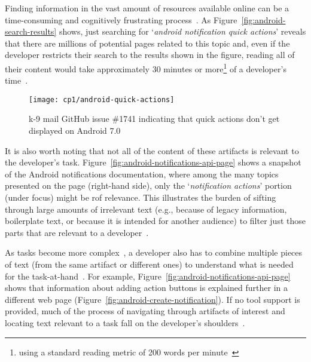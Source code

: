 



Finding information in the vast amount of resources available online can be a time-consuming
and cognitively frustrating process~\cite{Begel2008,
robillard2011field}. 
As Figure~\ref{fig:android-search-results} shows, just searching for `\textit{android notification quick actions}'
reveals that there are millions of potential pages related to this topic
and, even if the developer restricts their search to the results shown in the figure, reading all of their content would take approximately 30 minutes or more\footnote{using a standard reading metric of 200 words per minute~\cite{Just1980}} of a developer's time~\cite{endrikat2014, Meyer2017}. 


\begin{figure}
    \centering
    \texttt{[image: cp1/android-quick-actions]}
    \caption{k-9 mail GitHub issue \#1741 indicating that quick actions don't get displayed on Android 7.0}
    \label{fig:android-notifications-task}
\end{figure}



It is also worth noting that not all of the content of these artifacts is relevant to the developer's task. 
Figure~\ref{fig:android-notifications-api-page} shows a snapshot 
of the Android notifications documentation, where among  
the many topics presented on the page (right-hand side), only the `\textit{notification actions}' portion (under focus) might be rof relevance.
This illustrates the burden of sifting through large amounts of
irrelevant text (e.g., because of legacy information, boilerplate text, or because it is intended for another audience) to filter just those parts that are relevant to a developer~\cite{Robillard2015}. 


As tasks become more complex~\cite{Pirolli2007, Bystrom1995}, a developer also has to combine multiple pieces of text (from the same artifact or different ones) to understand what is needed for the task-at-hand~\cite{Piorkowski2016}. For example, Figure~\ref{fig:android-notifications-api-page} shows that information about adding
action buttons is explained further in a different web page (Figure~\ref{fig:android-create-notification}).
If no tool support is provided, much of the process of navigating through artifacts of interest and locating text 
relevant to a task fall on the developer's shoulders~\cite{gonccalves2011, Ko2006a, Bystrom1995}.


